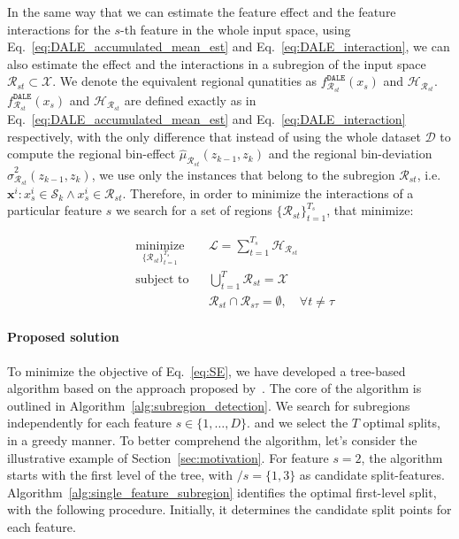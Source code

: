 \documentclass[12pt]{article}
\newcommand{\xb}{\mathbf{x}}
\begin{document}
In the same way that we can estimate the feature effect and the feature interactions for the $s$-th feature in the whole input space,
using Eq.~\eqref{eq:DALE_accumulated_mean_est} and Eq.~\eqref{eq:DALE_interaction},
we can also estimate the effect and the interactions in a subregion of the input space \(\mathcal{R}_{st} \subset \mathcal{X}\).
We denote the equivalent regional qunatities as $f^{\mathtt{DALE}}_{\mathcal{R}_{st}}(x_s)$ and $\mathcal{H}_{\mathcal{R}_{st}}$.
$f^{\mathtt{DALE}}_{\mathcal{R}_{st}}(x_s)$ and $\mathcal{H}_{\mathcal{R}_{st}}$ are defined exactly as in
Eq.~\eqref{eq:DALE_accumulated_mean_est} and Eq.~\eqref{eq:DALE_interaction} respectively,
with the only difference that instead of using the whole dataset \(\mathcal{D}\) to compute the regional bin-effect $\hat{\mu}_{\mathcal{R}_{st}}(z_{k-1}, z_k)$
and the regional bin-deviation $\hat{\sigma}_{\mathcal{R}_{st}}^2(z_{k-1}, z_k)$,
we use only the instances that belong to the subregion \(\mathcal{R}_{st}\), i.e. $\xb^i: x_s^i \in \mathcal{S}_k \land x_{s}^i \in \mathcal{R}_{st}$.
Therefore, in order to minimize the interactions of a particular feature $s$ we search for a set of regions \(\{\mathcal{R}_{st}\}_{t=1}^{T_s}\),
that minimize:

\begin{equation}
  \label{eq:optimal_subregions}
  \begin{aligned}
    & \underset{\{\mathcal{R}_{st}\}_{t=1}^{T_s}}{\text{minimize}}
    & & \mathcal{L} = \sum_{t=1}^{T_s} \mathcal{H}_{\mathcal{R}_{st}} \\
    & \text{subject to}
    & & \bigcup_{t=1}^{T} \mathcal{R}_{st} = \mathcal{X} \\
    & & & \mathcal{R}_{st} \cap \mathcal{R}_{s\tau} = \emptyset, \quad \forall t \neq \tau
  \end{aligned}
\end{equation}
%



\paragraph{Proposed solution}

To minimize the objective of Eq.~\eqref{eq:SE}, we have developed a tree-based algorithm based on the approach proposed
by~\citep{herbinger2023decomposing}.
The core of the algorithm is outlined in Algorithm~\ref{alg:subregion_detection}.
We search for subregions independently for each feature $s \in \{1, \ldots, D\}$.
and we select the $T$ optimal splits, in a greedy manner.
To better comprehend the algorithm, let's consider the illustrative example of Section~\ref{sec:motivation}.
For feature $s=2$, the algorithm starts with the first level of the tree, with $/s = \{1, 3\}$ as candidate split-features.
Algorithm~\ref{alg:single_feature_subregion} identifies the optimal first-level split, with the following procedure.
Initially, it determines the candidate split points for each feature.
\end{document}

